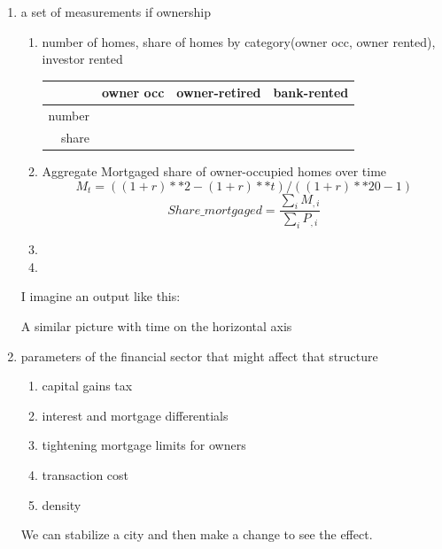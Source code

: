 \begin{enumerate}
    \item a set of measurements if ownership

        \begin{enumerate}
        \item number of homes, share of homes by category(owner occ, owner rented), 
        investor rented
        
\begin{tabular}{|r|c|c|c|}\hline
            & owner occ& owner-retired & bank-rented\\ \hline
number      & && \\ \hline
share       & && \\\hline
\end{tabular}

        \item Aggregate Mortgaged share of owner-occupied homes over time 
\[M_t=((1+r)**2-(1+r)**t) / ((1+r)**20-1)\]
\[Share\_mortgaged =\frac{\sum_i M_{,i}}{\sum_iP_{,i}}\]
        \item
        \item
        \end{enumerate} 


I imagine an output like this:


A similar picture with time on the horizontal axis

    \item parameters of the financial sector  that might affect that structure
    \begin{enumerate}
        \item capital gains tax
        \item interest and mortgage differentials
        \item tightening mortgage limits for owners
        \item transaction cost
        \item density
        
    \end{enumerate}

We can stabilize a city and then make a change to see the effect.

    
\end{enumerate}
